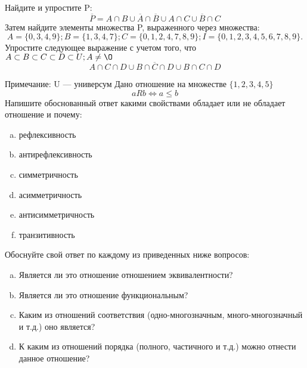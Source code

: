 \documentclass[10pt]{exam}
\begin{document}
\begin{questions}
\question
Найдите и упростите P:
\begin{equation*}
\overline{P} = A \cap B \cup \overline{A} \cap \overline{B} \cup A \cap C \cup \overline{B} \cap C
\end{equation*}
Затем найдите элементы множества P, выраженного через множества:
\begin{equation*}
A = \{0, 3, 4, 9\}; 
B = \{1, 3, 4, 7\};
C = \{0, 1, 2, 4, 7, 8, 9\};
I = \{0, 1, 2, 3, 4, 5, 6, 7, 8, 9\}.
\end{equation*}\question
Упростите следующее выражение с учетом того, что $A\subset B \subset C \subset D \subset U; A \neq \O$
\begin{equation*}
A \cap C  \cap D \cup B \cap \overline{C} \cap D \cup B \cap C \cap D
\end{equation*}

Примечание: U — универсум\question
Дано отношение на множестве $\{1, 2, 3, 4, 5\}$ 
\begin{equation*}
aRb \iff a \leq b
\end{equation*}
Напишите обоснованный ответ какими свойствами обладает или не обладает отношение и почему:   
\begin{enumerate} [a)]\setcounter{enumi}{0}
\item рефлексивность
\item антирефлексивность
\item симметричность
\item асимметричность
\item антисимметричность
\item транзитивность
\end{enumerate}

Обоснуйте свой ответ по каждому из приведенных ниже вопросов:
\begin{enumerate} [a)]\setcounter{enumi}{0}
    \item Является ли это отношение отношением эквивалентности?
    \item Является ли это отношение функциональным?
    \item Каким из отношений соответствия (одно-многозначным, много-многозначный и т.д.) оно является?
    \item К каким из отношений порядка (полного, частичного и т.д.) можно отнести данное отношение?
\end{enumerate}



\end{questions}
\end{document}
